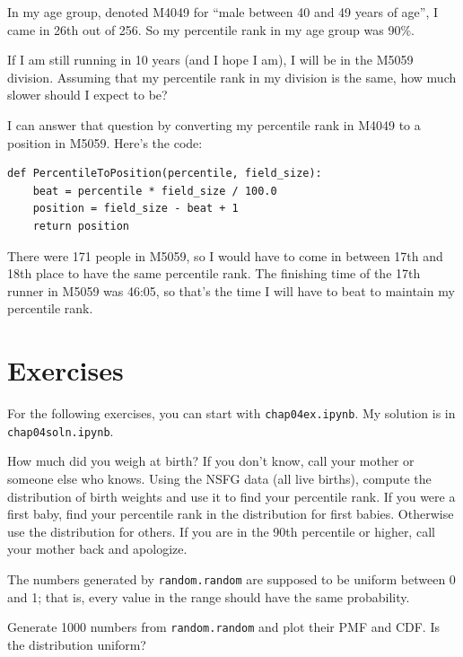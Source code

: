 \documentclass[12pt]{book}
\begin{document}
In my age group, denoted M4049 for ``male between 40 and 49 years of
age'', I came in 26th out of 256.  So my percentile rank in my age
group was 90\%.

If I am still running in 10 years (and I hope I am), I will be in
the M5059 division.  Assuming that my percentile rank in my division
is the same, how much slower should I expect to be?

I can answer that question by converting my percentile rank in M4049
to a position in M5059.  Here's the code:

\begin{verbatim}
def PercentileToPosition(percentile, field_size):
    beat = percentile * field_size / 100.0
    position = field_size - beat + 1
    return position
\end{verbatim}

There were 171 people in M5059, so I would have to come in between
17th and 18th place to have the same percentile rank.  The finishing
time of the 17th runner in M5059 was 46:05, so that's the time I will
have to beat to maintain my percentile rank.


\section{Exercises}

For the following exercises, you can start with \verb"chap04ex.ipynb".
My solution is in \verb"chap04soln.ipynb".

\begin{exercise}
How much did you weigh at birth?  If you don't know, call your mother
or someone else who knows.  Using the NSFG data (all live births),
compute the distribution of birth weights and use it to find your
percentile rank.  If you were a first baby, find your percentile rank
in the distribution for first babies.  Otherwise use the distribution
for others.  If you are in the 90th percentile or higher, call your
mother back and apologize.

\end{exercise}

\begin{exercise}
The numbers generated by \verb"random.random" are supposed to be
uniform between 0 and 1; that is, every value in the range
should have the same probability.

Generate 1000 numbers from \verb"random.random" and plot their
PMF and CDF.  Is the distribution uniform?

\end{exercise}
\end{document}
